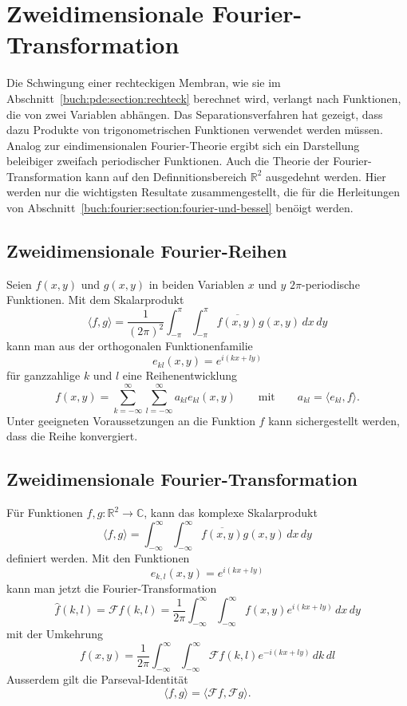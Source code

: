 %
%
%
\section{Zweidimensionale Fourier-Transformation
\label{buch:fourier:section:2d}}
Die Schwingung einer rechteckigen Membran, wie sie im
Abschnitt~\ref{buch:pde:section:rechteck} berechnet wird,
verlangt nach Funktionen, die von zwei Variablen abhängen.
Das Separationsverfahren hat gezeigt, dass dazu Produkte
von trigonometrischen Funktionen verwendet werden müssen.
Analog zur eindimensionalen Fourier-Theorie ergibt sich
ein Darstellung beleibiger zweifach periodischer Funktionen.
Auch die Theorie der Fourier-Transformation kann auf
den Definnitionsbereich $\mathbb{R}^2$ ausgedehnt werden.
Hier werden nur die wichtigsten Resultate zusammengestellt,
die für die Herleitungen von
Abschnitt~\ref{buch:fourier:section:fourier-und-bessel}
benöigt werden.

%
%
\subsection{Zweidimensionale Fourier-Reihen}
Seien $f(x,y)$ und $g(x,y)$ in beiden Variablen $x$ und $y$
$2\pi$-periodische Funktionen.
Mit dem Skalarprodukt
\[
\langle f,g\rangle
=
\frac{1}{(2\pi)^2}
\int_{-\pi}^\pi
\int_{-\pi}^\pi
\overline{f(x,y)} g(x,y)
\,dx
\,dy
\]
kann man aus der orthogonalen Funktionenfamilie
\[
e_{kl}(x,y)
=
e^{i(kx + ly)}
\]
für ganzzahlige $k$ und $l$ eine Reihenentwicklung
\[
f(x,y)
=
\sum_{k=-\infty}^\infty
\sum_{l=-\infty}^\infty
a_{kl}
e_{kl}(x,y)
\qquad\text{mit}\qquad
a_{kl}
=
\langle e_{kl},f\rangle.
\]
Unter geeigneten Voraussetzungen an die Funktion $f$ kann sichergestellt
werden, dass die Reihe konvergiert.

%
%
\subsection{Zweidimensionale Fourier-Transformation}
Für Funktionen $f,g\colon \mathbb{R}^2 \to \mathbb{C}$, kann das komplexe
Skalarprodukt
\[
\langle f,g\rangle
=
\int_{-\infty}^\infty
\int_{-\infty}^\infty
\overline{f(x,y)} g(x,y)
\,dx\,dy
\]
definiert werden.
Mit den Funktionen
\[
e_{k,l}(x,y)
=
e^{i(kx+ly)}
\]
kann man jetzt die Fourier-Transformation
\[
\hat{f}(k,l)
=
\mathscr{F}f(k,l)
=
\frac{1}{2\pi}
\int_{-\infty}^\infty
\int_{-\infty}^\infty
f(x,y) e^{i(kx+ly)}
\,dx\,dy
\]
mit der Umkehrung
\[
f(x,y)
=
\frac{1}{2\pi}
\int_{-\infty}^\infty
\int_{-\infty}^\infty
\mathscr{F}f(k,l) e^{-i(kx+ly)}
\,dk\,dl
\]
Ausserdem gilt die Parseval-Identität
\[
\langle f,g\rangle
=
\langle \mathscr{F}f,\mathscr{F}g\rangle.
\]



